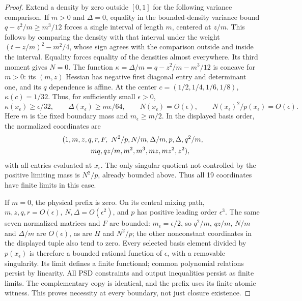 \documentclass[pdflatex,sn-mathphys-num]{sn-jnl}
\theoremstyle{thmstyleone}
\theoremstyle{thmstyletwo}\newtheorem{remark}[theorem]{Remark}
\begin{document}
\begin{proof}
Extend a density by zero outside $[0,1]$ for the following variance comparison.
If $m>0$ and $\Delta=0$, equality in the bounded-density variance bound
$q-z^2/m\ge m^3/12$ forces a single interval of length $m$, centered at
$z/m$. This follows by comparing the density with that interval under the
weight $(t-z/m)^2-m^2/4$, whose sign agrees with the comparison outside
and inside the interval. Equality forces equality of the densities almost
everywhere. Its third moment gives $N=0$. The function
$\kappa=\Delta/m=q-z^2/m-m^3/12$ is concave for $m>0$:
its $(m,z)$ Hessian has negative first diagonal entry and determinant one,
and its $q$ dependence is affine. At the center
$c=(1/2,1/4,1/6,1/8)$, $\kappa(c)=1/32$. Thus, for sufficiently small
$\epsilon>0$,
\[
 \kappa(x_\epsilon)\ge\epsilon/32,\qquad
 \Delta(x_\epsilon)\ge m\epsilon/64,\qquad
 N(x_\epsilon)=O(\epsilon),\qquad N(x_\epsilon)^2/p(x_\epsilon)=O(\epsilon).
\]
Here $m$ is the fixed boundary mass and $m_\epsilon\ge m/2$.
In the displayed basis order, the normalized coordinates are
\[
 \begin{aligned}
 &(1,m,z,q,r,F,\ N^2/p,N/m,\Delta/m,p,\Delta,q^2/m,\\
 &\hspace{14mm}mq,qz/m,m^2,m^3,mz,mz^2,z^2),
 \end{aligned}
\]
with all entries evaluated at $x_\epsilon$. The only singular quotient
not controlled by the positive limiting mass is $N^2/p$, already bounded
above. Thus all 19 coordinates have finite limits in this case.

If $m=0$, the physical prefix is zero. On its central mixing path,
$m,z,q,r=O(\epsilon)$, $N,\Delta=O(\epsilon^2)$, and $p$ has positive
leading order $\epsilon^3$. The same seven normalized matrices and $F$
are bounded: $m_\epsilon=\epsilon/2$, so $q^2/m$, $qz/m$, $N/m$ and
$\Delta/m$ are $O(\epsilon)$, as are $H$ and $N^2/p$; the other nonconstant
coordinates in the displayed tuple also tend to zero. Every selected
basis element divided by $p(x_\epsilon)$ is therefore a bounded
rational function of $\epsilon$, with a removable singularity. Its limit
defines a finite functional; common polynomial relations persist by linearity.
All PSD constraints and output inequalities persist as finite limits. The
complementary copy is identical, and the prefix uses its finite atomic
witness. This proves necessity at every boundary, not just closure existence.


\end{proof}
\end{document}
